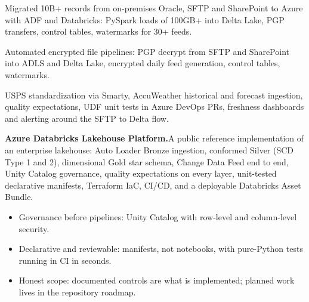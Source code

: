 \documentclass[10pt,a4paper]{article}
\begin{document}
{\small Migrated 10B+ records from on-premises Oracle, SFTP and SharePoint
  to Azure with ADF and Databricks: PySpark loads of 100GB+ into Delta
  Lake, PGP transfers, control tables, watermarks for 30+ feeds.}

{\small Automated encrypted file pipelines: PGP decrypt from SFTP and
  SharePoint into ADLS and Delta Lake, encrypted daily feed generation,
  control tables, watermarks.}

{\small USPS standardization via Smarty, AccuWeather historical and forecast
  ingestion, quality expectations, UDF unit tests in Azure DevOps PRs,
  freshness dashboards and alerting around the SFTP to Delta flow.}


{\small\textbf{Azure Databricks Lakehouse Platform.}\enspace A public
reference implementation of an enterprise lakehouse: Auto Loader Bronze
ingestion, conformed Silver (SCD Type 1 and 2), dimensional Gold star
schema, Change Data Feed end to end, Unity Catalog governance, quality
expectations on every layer, unit-tested declarative manifests, Terraform
IaC, CI/CD, and a deployable Databricks Asset Bundle.

\begin{itemize}[leftmargin=1.25em, itemsep=0.5pt, topsep=1.5pt]
  \item Governance before pipelines: Unity Catalog with row-level and
        column-level security.
  \item Declarative and reviewable: manifests, not notebooks, with
        pure-Python tests running in CI in seconds.
  \item Honest scope: documented controls are what is implemented;
        planned work lives in the repository roadmap.
\end{itemize}}
\end{document}
